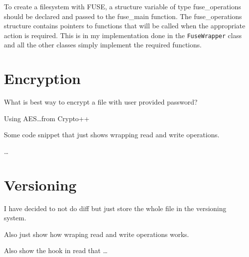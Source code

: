 To create a filesystem with FUSE, a structure variable of type fuse\_operations should be declared and passed to the fuse\_main function.
The fuse\_operations structure contains pointers to functions that will be called when the appropriate action is required.
This is in my implementation done in the \texttt{FuseWrapper} class and all the other classes simply implement the required functions.

\section{Encryption}

What is best way to encrypt a file with user provided password?

Using AES\ldots from Crypto++

Some code snippet that just shows wrapping read and write operations.

\ldots

\section{Versioning}

I have decided to not do diff but just store the whole file in the versioning system.

Also just show how wraping read and write operations works.

Also show the hook in read that \ldots